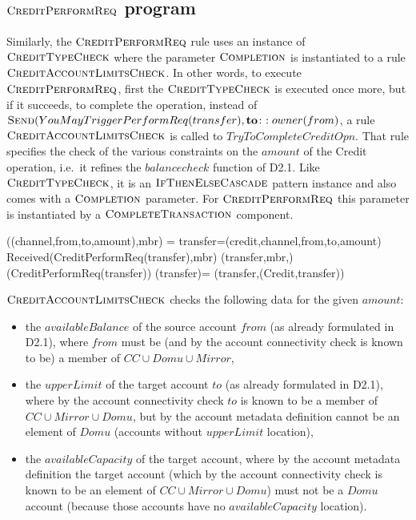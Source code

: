 \subsection{ $\hbox{\sc CreditPerformReq}$ program}
\label{sect:creditperform}


Similarly, the $\hbox{\sc CreditPerformReq}$ rule uses an instance of  $\hbox{\sc CreditTypeCheck}$ where the parameter $\hbox{\sc Completion}$  is instantiated to a rule
$\hbox{\sc CreditAccountLimitsCheck}$. In other words, to execute $\hbox{\sc CreditPerformReq}$, first the $\hbox{\sc CreditTypeCheck}$ is executed once more, but if it succeeds, to complete the operation, instead of $\hbox{\sc Send} (YouMayTriggerPerformReq(transfer),\mathrel{\mathbf{to\colon}} :owner(from)$, a rule $\hbox{\sc CreditAccountLimitsCheck}$ is called to $TryToCompleteCreditOpn$. That rule specifies the check of the various constraints on the $amount$ of the Credit operation, i.e.\ it refines the $balancecheck$ function of D2.1. Like $\hbox{\sc CreditTypeCheck}$, it is an $\hbox{\sc IfThenElseCascade}$ pattern instance and also comes with a $\hbox{\sc Completion}$ parameter. For $\hbox{\sc CreditPerformReq}$ this parameter is instantiated by a $\hbox{\sc CompleteTransaction}$ component.

\begin{asm}
((channel,from,to,amount),mbr)  =\+
\LET transfer=(credit,channel,from,to,amount)\\
\IF Received(CreditPerformReq(transfer),\FROM mbr) \THEN \+  
  (transfer,mbr,)\\
   (CreditPerformReq(transfer))\-
\WHERE \+
  (transfer)=\+
     (transfer,(Credit,transfer))
\end{asm}

$\hbox{\sc CreditAccountLimitsCheck}$ checks the following data for the given $amount$:
\begin{itemize}
	\item the $availableBalance$ of the source account $from$ (as already formulated in D2.1), where $from$ must be (and by the account connectivity check is known to be) a member of $CC \cup Domu \cup Mirror$,
	
	\item the $upperLimit$ of the target account $to$ (as already formulated in D2.1), where by the account connectivity check $to$ is known to be a member of $CC \cup  Mirror \cup Domu$, but by the account metadata definition cannot be an element of $Domu$ (accounts without $upperLimit$ location), 
	 
	 \item the $availableCapacity$ of the target account, where by the account metadata definition the target account (which by the account connectivity check is known to be an element of $CC \cup  Mirror \cup Domu$) must not be a $Domu$ account (because those accounts have no $availableCapacity$ location).
 \end{itemize} 


